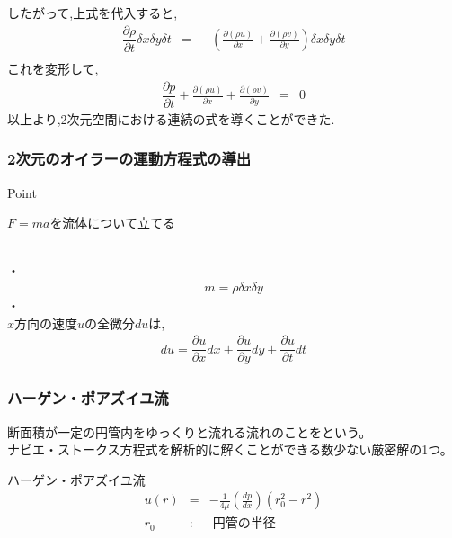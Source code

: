 \documentclass[a4paper]{jsarticle}
\begin{document}
したがって,上式を代入すると,
\begin{eqnarray*}
    \dfrac{\partial \rho}{\partial t}\delta x \delta y \delta t&=&-\left(\frac{\partial\left(\rho u\right)}{\partial x}+\frac{\partial\left(\rho v\right)}{\partial y}\right)\delta x \delta y \delta t\\
\end{eqnarray*}
これを変形して,
\begin{eqnarray*}
    \dfrac{\partial p}{\partial t}+\frac{\partial\left(\rho u\right)}{\partial x}+\frac{\partial\left(\rho v\right)}{\partial y}&=&0
\end{eqnarray*}
以上より,2次元空間における連続の式を導くことができた.
\subsubsection{2次元のオイラーの運動方程式の導出}
\begin{itembox}[l]{Point}
    \begin{center}
        \quad$F=ma$を流体について立てる
    \end{center}
\end{itembox}
\\
・\\
\begin{eqnarray*}
    m=\rho \delta x \delta y
\end{eqnarray*}
・\\
$x$方向の速度$u$の全微分$du$は,
\begin{eqnarray*}
    du=\dfrac{\partial u}{\partial x}dx+\dfrac{\partial u}{\partial y}dy+\dfrac{\partial u}{\partial t}dt
\end{eqnarray*}
\subsubsection{ハーゲン・ポアズイユ流}
断面積が一定の円管内をゆっくりと流れる流れのことをという。\\
ナビエ・ストークス方程式を解析的に解くことができる数少ない厳密解の1つ。
\begin{itembox}[l]{ハーゲン・ポアズイユ流}
    \begin{eqnarray*}
        u\left(r\right)&=&-\frac{1}{4\mu}\left(\frac{dp}{dx}\right)\left(r_0^2-r^2\right)\\
        r_0\; &:&\; 円管の半径\\
    \end{eqnarray*}
\end{itembox}
\end{document}

